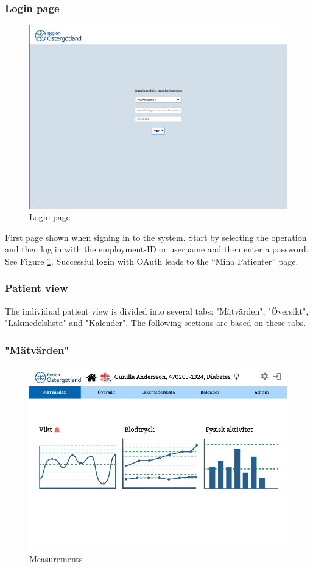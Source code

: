 \documentclass{scrreprt}
\begin{document}
\subsubsection{Login page}
\begin{figure}[h!]
    \centering
    \includegraphics[width=15cm]{login.png}
    \caption{Login page}
    \label{fig: login}
\end{figure}

First page shown when signing in to the system. Start by selecting the operation and then log in with the employment-ID or username and then enter a password. See Figure \ref{fig: login}. Successful login with OAuth leads to the “Mina Patienter” page. 

\subsubsection{Patient view}
The individual patient view is divided into several tabs: "Mätvärden", "Översikt", "Läkmedelslista" and  "Kalender". The following sections are based on these tabs. 

\subsubsection{"Mätvärden"}
\begin{figure}[h!]
    \centering
    \includegraphics[width=15cm]{meas.png}
    \caption{Measurements}
    \label{fig: meas}
\end{figure}
\end{document}
